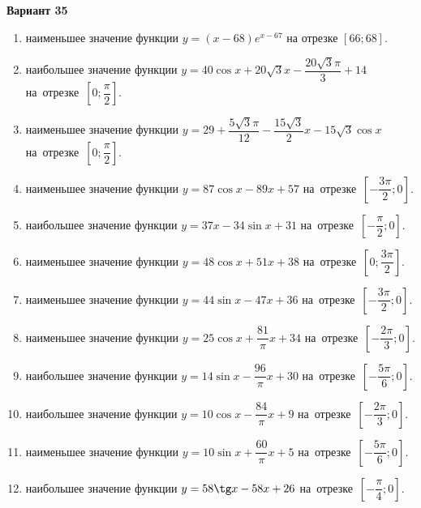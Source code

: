 \documentclass[a4paper,10pt]{article}
\begin{document}
\begin{center}\Large\textbf{Вариант 35}\end{center}

\begin{enumerate}
\item {} наименьшее значение функции $y = \left(x-68\right)e^{x-67}$ на отрезке $\left[66;68\right]$.

\item {} наибольшее значение функции $y = 40\cos x+20\sqrt{3}x-\dfrac{20\sqrt{3}\pi}{3} +14$ на~отрезке~$\left[0;\dfrac{\pi }{2}\right]$.

\item {} наименьшее значение функции $y = 29+\dfrac{5\sqrt{3} \pi}{12}-\dfrac{15\sqrt{3}}{2}x-15\sqrt{3}\cos x$ на~отрезке~$\left[0;\dfrac{\pi }{2}\right]$.

\item {} наименьшее значение функции $y = 87\cos x-89x+57$ на~отрезке~$\left[-\dfrac{3\pi }{2};0\right]$.

\item {} наибольшее значение функции $y = 37x-34\sin x+31$ на~отрезке~$\left[-\dfrac{\pi }{2};0\right]$.

\item {} наименьшее значение функции $y = 48\cos x+51x+38$ на~отрезке~$\left[0;\dfrac{3\pi }{2}\right]$.

\item {} наименьшее значение функции $y = 44\sin x-47x+36$ на~отрезке~$\left[-\dfrac{3\pi }{2};0\right]$.

\item {} наименьшее значение функции $y = 25\cos x+\dfrac{81}{\pi }x +34$ на~отрезке~$\left[-\dfrac{2\pi }{3};0\right]$.

\item {} наибольшее значение функции $y = 14\sin x-\dfrac{96}{\pi }x+30$ на~отрезке~$\left[-\dfrac{5\pi }{6};0\right]$.

\item {} наибольшее значение функции $y = 10\cos x-\dfrac{84}{\pi }x+9$ на~отрезке~$\left[-\dfrac{2\pi }{3};0\right]$.

\item {} наименьшее значение функции $y = 10\sin x+\dfrac{60}{\pi }x+5$ на~отрезке~$\left[-\dfrac{5\pi }{6};0\right]$.

\item {} наибольшее значение функции $y = 58\tg x-58x+26$ на~отрезке~$\left[-\dfrac{\pi }{4};0\right]$.


\end{enumerate}
\end{document}
